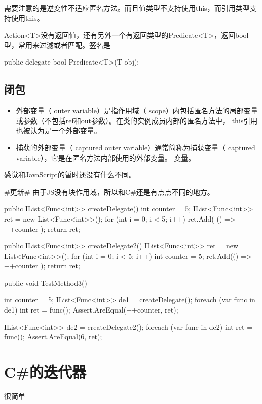 需要注意的是逆变性不适应匿名方法。而且值类型不支持使用this，而引用类型支持使用this。


Action<T>没有返回值，还有另外一个有返回类型的Predicate<T>，返回bool型，常用来过滤或者匹配。签名是
\begin{CSharp}
		public delegate bool Predicate<T>(T obj);
\end{CSharp}

\section{闭包}
\begin{itemize}
\item 外部变量（ outer variable）是指作用域（ scope）内包括匿名方法的局部变量或参数（不包括ref和out参数）。在类的实例成员内部的匿名方法中， this引用也被认为是一个外部变量。
\item 捕获的外部变量（ captured outer variable）通常简称为捕获变量（ captured variable），它是在匿名方法内部使用的外部变量。
变量。
\end{itemize}

感觉和JavaScript的暂时还没有什么不同。


\#更新\#
由于JS没有块作用域，所以和C\#还是有点点不同的地方。

\begin{CSharp}
        public IList<Func<int>> createDelegate()
        {
            int counter = 5;
            IList<Func<int>> ret = new List<Func<int>>();
            for (int i = 0; i < 5; i++)
            {
                ret.Add( () => ++counter );
            }
            return ret; 
        }
\end{CSharp}

\begin{CSharp}
        public IList<Func<int>> createDelegate2()
        {
            IList<Func<int>> ret = new List<Func<int>>();
            for (int i = 0; i < 5; i++)
            {
                int counter = 5;    
                ret.Add(() => ++counter );
            }
            return ret;
        }
\end{CSharp}

\begin{CSharp}[运行结果]
        [TestMethod]
        public void TestMethod3()
        {
            int counter = 5;
            IList<Func<int>> de1 = createDelegate();
            foreach (var func in de1)
            {
                int ret = func();
                Assert.AreEqual(++counter, ret);
            }

            IList<Func<int>> de2 = createDelegate2();
            foreach (var func in de2)
            {
                int ret = func();
                Assert.AreEqual(6, ret);
            }
        }
\end{CSharp}


\chapter{C\#的迭代器}

很简单